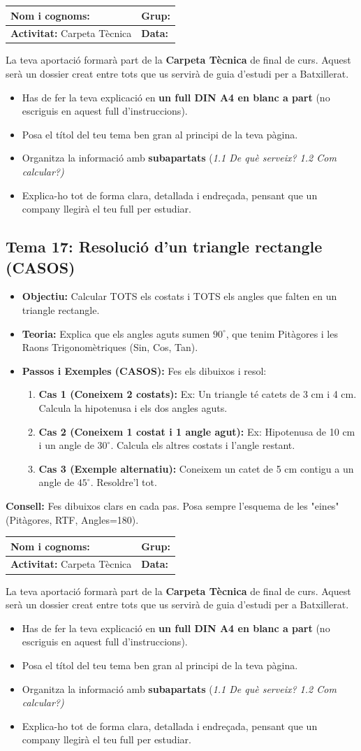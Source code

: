\documentclass[12pt,a4paper]{article}
\newcommand{\introcomuna}{
    \begin{tcolorbox}[colback=gray!5,colframe=gray!50!black,title=\textbf{La Carpeta Tècnica de Matemàtiques}]
    La teva aportació formarà part de la \textbf{Carpeta Tècnica} de final de curs. Aquest serà un dossier creat entre tots que us servirà de guia d'estudi per a Batxillerat.
    
    \begin{itemize}[label=\textbullet, leftmargin=*]
        \item Has de fer la teva explicació en \textbf{un full DIN A4 en blanc a part} (no escriguis en aquest full d'instruccions).
        \item Posa el títol del teu tema ben gran al principi de la teva pàgina.
        \item Organitza la informació amb \textbf{subapartats} (\textit{1.1 De què serveix? 1.2 Com calcular?)}
        \item Explica-ho tot de forma clara, detallada i endreçada, pensant que un company llegirà el teu full per estudiar.
    \end{itemize}
    \end{tcolorbox}
    \vspace{0.1cm}
}
\newcommand{\capcaleraalumne}[1]{
    \begingroup
    \renewcommand{\arraystretch}{2.2}
    \begin{tabularx}{\textwidth}{|X|p{4cm}|}
    \hline
    \textbf{Nom i cognoms:} & \textbf{Grup:} \\ \hline
    \textbf{Activitat:} Carpeta Tècnica & \textbf{Data:} \\ \hline
    \end{tabularx}
    \endgroup
    \vspace{0.4cm}
}
\begin{document}
\newpage
\capcaleraalumne{17}
\introcomuna
\subsection*{Tema 17: Resolució d'un triangle rectangle (CASOS)}
\begin{itemize}[label=\textbullet]
    \item \textbf{Objectiu:} Calcular TOTS els costats i TOTS els angles que falten en un triangle rectangle.
    \item \textbf{Teoria:} Explica que els angles aguts sumen $90^{\circ}$, que tenim Pitàgores i les Raons Trigonomètriques (Sin, Cos, Tan).
    \item \textbf{Passos i Exemples (CASOS):} Fes els dibuixos i resol:
    \begin{enumerate}
        \item \textbf{Cas 1 (Coneixem 2 costats):} Ex: Un triangle té catets de 3 cm i 4 cm. Calcula la hipotenusa i els dos angles aguts.
        \item \textbf{Cas 2 (Coneixem 1 costat i 1 angle agut):} Ex: Hipotenusa de 10 cm i un angle de $30^{\circ}$. Calcula els altres costats i l'angle restant.
        \item \textbf{Cas 3 (Exemple alternatiu):} Coneixem un catet de 5 cm contigu a un angle de $45^{\circ}$. Resoldre'l tot.
    \end{enumerate}
\end{itemize}
\vfill
\noindent\textbf{Consell:} Fes dibuixos clars en cada pas. Posa sempre l'esquema de les "eines" (Pitàgores, RTF, Angles=180).

\newpage
\capcaleraalumne{18}
\introcomuna
\end{document}
